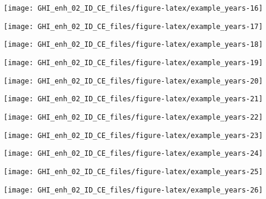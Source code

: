 \documentclass[
  10pt,
  a4paper,oneside]{article}
\begin{document}
\begin{center}\texttt{[image: GHI\_enh\_02\_ID\_CE\_files/figure-latex/example\_years-16]} \end{center}

\begin{center}\texttt{[image: GHI\_enh\_02\_ID\_CE\_files/figure-latex/example\_years-17]} \end{center}

\begin{center}\texttt{[image: GHI\_enh\_02\_ID\_CE\_files/figure-latex/example\_years-18]} \end{center}

\begin{center}\texttt{[image: GHI\_enh\_02\_ID\_CE\_files/figure-latex/example\_years-19]} \end{center}

\begin{center}\texttt{[image: GHI\_enh\_02\_ID\_CE\_files/figure-latex/example\_years-20]} \end{center}

\begin{center}\texttt{[image: GHI\_enh\_02\_ID\_CE\_files/figure-latex/example\_years-21]} \end{center}

\begin{center}\texttt{[image: GHI\_enh\_02\_ID\_CE\_files/figure-latex/example\_years-22]} \end{center}

\begin{center}\texttt{[image: GHI\_enh\_02\_ID\_CE\_files/figure-latex/example\_years-23]} \end{center}

\begin{center}\texttt{[image: GHI\_enh\_02\_ID\_CE\_files/figure-latex/example\_years-24]} \end{center}

\begin{center}\texttt{[image: GHI\_enh\_02\_ID\_CE\_files/figure-latex/example\_years-25]} \end{center}

\begin{center}\texttt{[image: GHI\_enh\_02\_ID\_CE\_files/figure-latex/example\_years-26]} \end{center}
\end{document}
